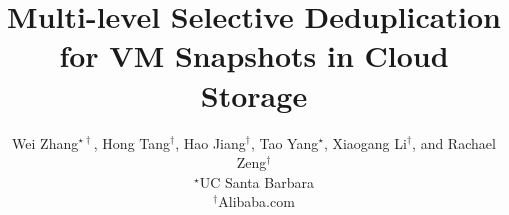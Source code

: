 \documentclass[finalversion]{usetex-v1}
\begin{document}
\title{Multi-level Selective Deduplication for VM Snapshots in Cloud Storage}
\author{Wei Zhang$^{\star\dagger}$, Hong Tang$^\dagger$, Hao Jiang$^\dagger$, Tao Yang$^\star$, 
Xiaogang Li$^\dagger$, and Rachael Zeng$^\dagger$ \\
   {\normalsize $^\star$UC Santa Barbara}\\
   {\normalsize$^\dagger$Alibaba.com}
}


\date{}
\maketitle



%
%
%



  \let\oldthebibliography=\thebibliography
  \let\endoldthebibliography=\endthebibliography
  \renewenvironment{thebibliography}[1]{%
    \begin{oldthebibliography}{#1}%
      \setlength{\parskip}{-0.02ex}%
      \setlength{\itemsep}{-0.02ex}%
      \setlength{\baselineskip}{-0.02ex}%

  }%
  {%
    \end{oldthebibliography}%
  }
{\small


}
\end{document}
